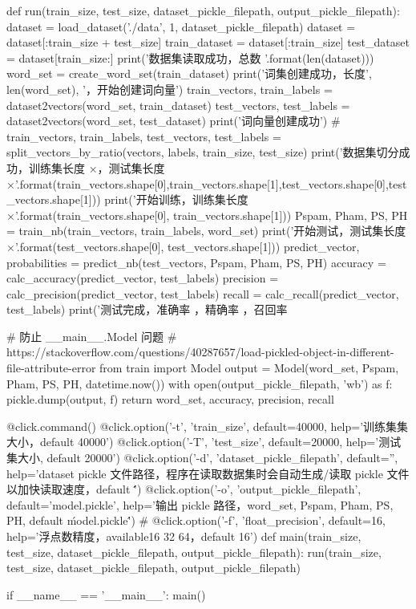 \documentclass[UTF8,zihao=-4]{ctexart}
\begin{document}
\begin{python}
def run(train_size, test_size, dataset_pickle_filepath, output_pickle_filepath):
    dataset = load_dataset('./data', 1, dataset_pickle_filepath)
    dataset = dataset[:train_size + test_size]
    train_dataset = dataset[:train_size]
    test_dataset = dataset[train_size:]
    print('数据集读取成功，总数 {}'.format(len(dataset)))
    word_set = create_word_set(train_dataset)
    print('词集创建成功，长度', len(word_set), '，开始创建词向量')
    train_vectors, train_labels = dataset2vectors(word_set, train_dataset)
    test_vectors, test_labels = dataset2vectors(word_set, test_dataset)
    print('词向量创建成功')
    # train_vectors, train_labels, test_vectors, test_labels = split_vectors_by_ratio(vectors, labels, train_size, test_size)
    print('数据集切分成功，训练集长度 {}×{}，测试集长度 {}×{}'.format(train_vectors.shape[0],train_vectors.shape[1],test_vectors.shape[0],test_vectors.shape[1]))
    print('开始训练，训练集长度 {}×{}'.format(train_vectors.shape[0], train_vectors.shape[1]))
    Pspam, Pham, PS, PH = train_nb(train_vectors, train_labels, word_set)
    print('开始测试，测试集长度 {}×{}'.format(test_vectors.shape[0], test_vectors.shape[1]))
    predict_vector, probabilities = predict_nb(test_vectors, Pspam, Pham, PS, PH)
    accuracy = calc_accuracy(predict_vector, test_labels)
    precision = calc_precision(predict_vector, test_labels)
    recall = calc_recall(predict_vector, test_labels)
    print('测试完成，准确率 {}，精确率 {}，召回率 {}%

    # 防止 __main__.Model 问题
    # https://stackoverflow.com/questions/40287657/load-pickled-object-in-different-file-attribute-error
    from train import Model
    output = Model(word_set, Pspam, Pham, PS, PH, datetime.now())
    with open(output_pickle_filepath, 'wb') as f:
        pickle.dump(output, f)
    return word_set, accuracy, precision, recall


@click.command()
@click.option('-t', 'train_size', default=40000, help='训练集集大小，default 40000')
@click.option('-T', 'test_size', default=20000, help='测试集大小, default 20000')
@click.option('-d', 'dataset_pickle_filepath', default='',
              help='dataset pickle 文件路径，程序在读取数据集时会自动生成/读取 pickle 文件以加快读取速度，default \'\'')
@click.option('-o', 'output_pickle_filepath', default='model.pickle',
              help='输出 pickle 路径，{word_set, Pspam, Pham, PS, PH}, default \'model.pickle\'')
# @click.option('-f', 'float_precision', default=16, help='浮点数精度，available16 32 64，default 16')
def main(train_size, test_size, dataset_pickle_filepath, output_pickle_filepath):
    run(train_size, test_size, dataset_pickle_filepath, output_pickle_filepath)


if __name__ == '__main__':
    main()
\end{python}
\end{document}
